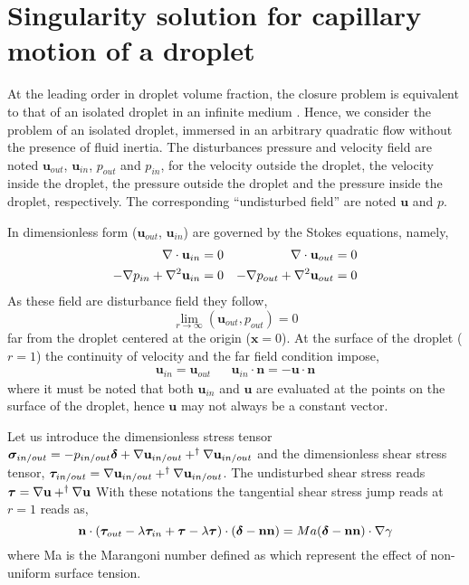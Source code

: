\section{Singularity solution for capillary motion of a droplet}
\label{ap:singularity_solution}
At the leading order in droplet volume fraction, the closure problem is equivalent to that of an isolated droplet in an infinite medium \citet{hinch1977averaged}. 
Hence, we consider the problem of an isolated droplet, immersed in an arbitrary quadratic flow without the presence of fluid inertia. 
The disturbances pressure and velocity field are noted $\textbf{u}_{out}$, $\textbf{u}_{in}$, $p_{out}$ and $p_{in}$, for the velocity outside the droplet, the velocity inside the droplet, the pressure outside the droplet and the pressure inside the droplet, respectively. 
The corresponding ``undisturbed field'' are noted $\textbf{u}$ and $p$. 

In dimensionless form ($\textbf{u}_{out}$, $\textbf{u}_{in}$) are governed by the Stokes equations, namely, 
\begin{align}
    \mathbf{\nabla}\cdot \textbf{u}_{in} = 0 
    && \mathbf{\nabla}\cdot \textbf{u}_{out} = 0 \\
    -\mathbf{\nabla} p_{in} + \mathbf{\nabla}^2 \textbf{u}_{in}  = 0 
    &&-\mathbf{\nabla} p_{out} + \mathbf{\nabla}^2 \textbf{u}_{out}  = 0 
\end{align}
As these field are disturbance field they follow,
\begin{equation}
    \lim_{r\to \infty}(\textbf{u}_{out},p_{out}) = 0 
\end{equation}
far from the droplet centered at the origin ($\textbf{x} = 0$). 
At the surface of the droplet ($r = 1$) the continuity of velocity and the far field condition impose, 
\begin{align}
    \textbf{u}_{in} = \textbf{u}_{out}
    && 
    \textbf{u}_{in} \cdot \textbf{n}
    =
    - \textbf{u}\cdot \textbf{n}
    \label{eq:boundary_cdt_vel}
\end{align}
where it must be noted that both $\textbf{u}_{in}$ and $\textbf{u}$ are evaluated at the points on the surface of the droplet, hence $\textbf{u}$ may not always be a constant vector. 

Let us introduce the dimensionless stress tensor $\bm\sigma_{in/out} = -p_{in/out} \bm\delta + \mathbf{\nabla} \textbf{u}_{in/out} + ^\dagger \mathbf{\nabla} \textbf{u}_{in/out}$ and the dimensionless shear stress tensor, $\bm\tau_{in/out} = \mathbf{\nabla} \textbf{u}_{in/out} + ^\dagger \mathbf{\nabla} \textbf{u}_{in/out}$. 
The undisturbed shear stress reads  $\bm\tau = \mathbf{\nabla} \textbf{u} + ^\dagger \mathbf{\nabla} \textbf{u}$
With these notations the tangential shear stress jump reads at $r = 1$ reads as, 
\begin{equation}
    \mathbf{n}\cdot (\bm\tau_{out} - \lambda \bm\tau_{in}+\bm\tau -\lambda\bm\tau)\cdot (\bm\delta - \textbf{nn})
    =Ma  (\bm\delta - \textbf{nn})\cdot \grad \gamma
    \label{eq:boundary_cdt_stress}
\end{equation}
where Ma is the Marangoni number defined as \citep{Kawakami_Vlahovska_2025} which represent the effect of non-uniform surface tension. 


